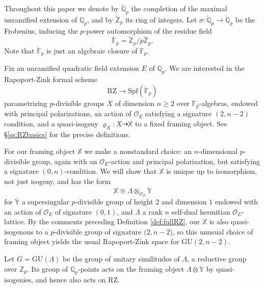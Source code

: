 \documentclass[11pt]{alggeom}
\newcommand{\iso}{\cong}
\newcommand{\Q}{\mathbb Q}
\newcommand{\Z}{\mathbb Z}
\newcommand{\F}{\mathbb F}
\newcommand{\co}{\mathcal O}
\begin{document}

Throughout this paper we denote by $\breve{\Q}_p$ the completion of the maximal unramified extension of $\Q_p$, and by 
$\breve{\Z}_p$ its ring of integers.  
Let $\sigma : \breve{\Q}_p \to \breve{\Q}_p$ be the Frobenius, inducing the $p$-power automorphism of the  residue field 
 \[
 \breve{\F}_p= \breve{\Z}_p / p\breve{\Z}_p.
 \]
Note that $\breve{\F}_p$ is just an algebraic closure of $\F_p$.

Fix an unramified quadratic field extension $E$ of $\Q_p$.  
We are interested in the Rapoport-Zink formal scheme 
\[
\mathrm{RZ} \to \mathrm{Spf}( \breve{\F}_p) 
\]
parametrizing $p$-divisible groups $X$ of dimension $n\ge 2$ over $\F_p$-algebras, endowed with principal polarizations, an action of $\co_E$ satisfying a signature $(2,n-2)$ condition, and a quasi-isogeny $\varrho_X : X \dashrightarrow \mathbb{X}$ to a fixed framing object.  See \S \ref{ss:RZbasics} for the precise definitions.


For our framing object $\mathbb{X}$ we make a nonstandard choice: an $n$-dimensional $p$-divisible group, again with an $\co_E$-action and principal polarization, but satisfying a signature $(0,n)$-condition.   We will show that $\mathbb{X}$ is unique up to isomorphism, not just isogeny, and has the form
\[
\mathbb{X} \iso \Lambda \otimes_{\co_E} \overline{\mathbb{Y}}
\]
for  $\overline{\mathbb{Y}}$ a supersingular $p$-divisible group of height $2$ and dimension $1$ endowed with an action of $\co_E$ of signature $(0,1)$, and $\Lambda$  a  rank $n$ self-dual hermitian $\co_E$-lattice.    
By the comments preceding  Definition \ref{def:fullRZ}, our $\mathbb{X}$ is  also quasi-isogenous to a $p$-divisible group of signature $(2,n-2$), so this unusual choice of framing object yields the usual Rapoport-Zink space for $\mathrm{GU}(2,n-2)$.


Let $G=\mathrm{GU}(\Lambda)$ be the group of unitary similitudes of $\Lambda$, a reductive group over $\Z_p$.  Its group of $\Q_p$-points acts on the framing object  $\Lambda \otimes \overline{\mathbb{Y}}$ by quasi-isogenies, and hence also acts on $\mathrm{RZ}$.
\end{document}
